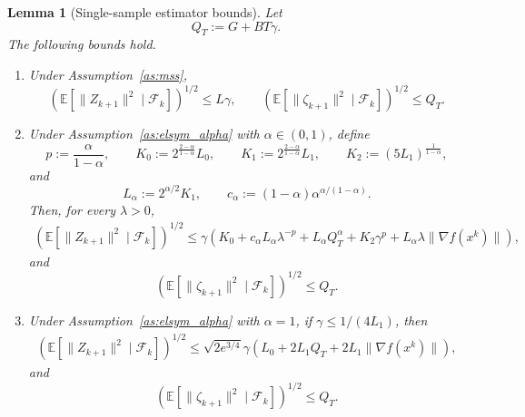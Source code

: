 \documentclass[letter,11pt]{article}
\newtheorem{lemma}[]{Lemma}
\newcommand{\E}{\mathbb{E}}
\newcommand{\cF}{\mathcal{F}}
\begin{document}
\begin{lemma}[Single-sample estimator bounds]
\label{lem:app_nstorm_estimator_bounds}
Let
\[
    Q_T:=G+BT\gamma.
\]
The following bounds hold.

\begin{enumerate}[label=(\roman*), leftmargin=*]
\item Under Assumption~\ref{as:mss},
\[
    \left(
        \E[\|Z_{k+1}\|^2\mid\cF_k]
    \right)^{1/2}
    \le
    L\gamma,
    \qquad
    \left(
        \E[\|\zeta_{k+1}\|^2\mid\cF_k]
    \right)^{1/2}
    \le
    Q_T.
\]

\item Under Assumption~\ref{as:elsym_alpha} with \(\alpha\in(0,1)\), define
\[
    p:=\frac{\alpha}{1-\alpha},
    \qquad
    K_0:=2^{\frac{2-\alpha}{1-\alpha}}L_0,
    \qquad
    K_1:=2^{\frac{2-\alpha}{1-\alpha}}L_1,
    \qquad
    K_2:=(5L_1)^{\frac1{1-\alpha}},
\]
and
\[
    L_\alpha:=2^{\alpha/2}K_1,
    \qquad
    c_\alpha:=(1-\alpha)\alpha^{\alpha/(1-\alpha)}.
\]
Then, for every \(\lambda>0\),
\[
\begin{aligned}
    \left(
        \E[\|Z_{k+1}\|^2\mid\cF_k]
    \right)^{1/2}
    \le
    \gamma
    \left(
        K_0
        +
        c_\alpha L_\alpha\lambda^{-p}
        +
        L_\alpha Q_T^\alpha
        +
        K_2\gamma^p
        +
        L_\alpha\lambda\|\nabla f(x^k)\|
    \right),
\end{aligned}
\]
and
\[
    \left(
        \E[\|\zeta_{k+1}\|^2\mid\cF_k]
    \right)^{1/2}
    \le
    Q_T.
\]

\item Under Assumption~\ref{as:elsym_alpha} with \(\alpha=1\), if
\(\gamma\le 1/(4L_1)\), then
\[
\begin{aligned}
    \left(
        \E[\|Z_{k+1}\|^2\mid\cF_k]
    \right)^{1/2}
    \le
    \sqrt{2e^{3/4}}\gamma
    \left(
        L_0+2L_1Q_T+2L_1\|\nabla f(x^k)\|
    \right),
\end{aligned}
\]
and
\[
    \left(
        \E[\|\zeta_{k+1}\|^2\mid\cF_k]
    \right)^{1/2}
    \le
    Q_T.
\]
\end{enumerate}
\end{lemma}
\end{document}
